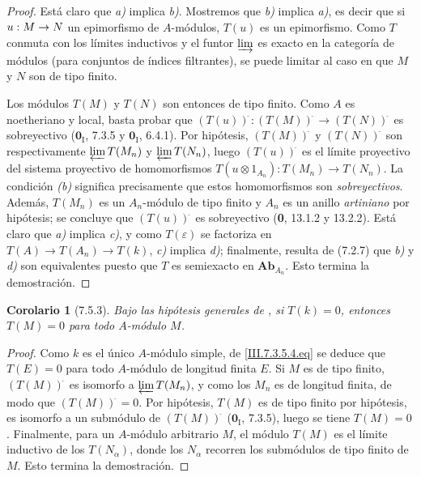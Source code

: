 \documentclass[10pt,oneside,openany]{book}
\theoremstyle{egaenv}\newtheorem*{env}{---}
\theoremstyle{egastatement}
\newtheorem*{corollary}{Corolario}
\theoremstyle{egadescription}
\newcommand{\oldpage}[2][]{\marginnote{\normalfont\scriptsize\textbf{#1}\,|\,#2}\ignorespaces}
\renewcommand{\to}{\mathchoice{\longrightarrow}{\rightarrow}{\rightarrow}{\rightarrow}}
\begin{document}
\begin{proof}
Está claro que \emph{a)} implica \emph{b)}. Mostremos que \emph{b)} implica \emph{a)}, es decir que si $u:M\to N$ un epimorfismo de $A$-módulos, $T(u)$
es un epimorfismo. Como $T$ conmuta con los límites inductivos y el funtor $\varinjlim$ es
exacto en la categoría de módulos (para conjuntos de índices filtrantes),
se puede limitar al caso en que $M$ y $N$ son de tipo
finito.

Los módulos $T(M)$ y $T(N)$ son entonces de tipo finito. Como $A$ es
noetheriano y local, basta probar que
$(T(u))^{\widehat{\,}}:(T(M))^{\widehat{\,}}\longrightarrow(T(N))^{\widehat{\,}}$
es sobreyectivo ($\mathbf{0}_{\mathrm I}$, 7.3.5 y $\mathbf{0}_{\mathrm I}$, 6.4.1). Por hipótesis,
$(T(M))^{\widehat{\,}}$ y $(T(N))^{\widehat{\,}}$ son respectivamente $\varprojlim T(M_n)$
y $\varprojlim T(N_n)$, luego $(T(u))^{\widehat{\,}}$ es el límite proyectivo del sistema proyectivo de
homomorfismos
$T(u\otimes1_{A_n}):T(M_n)\longrightarrow T(N_n)$.
La condición \emph{(b)} significa precisamente que estos homomorfismos son
\emph{sobreyectivos}. Además, $T(M_n)$ es un $A_n$-módulo de tipo finito y
$A_n$ es un anillo \emph{artiniano} por hipótesis; se concluye que $(T(u))^{\widehat{\,}}$ es sobreyectivo (\textbf{0}, 13.1.2 y
13.2.2). Está claro que \emph{a)} implica \emph{c)}, y como $T(\varepsilon)$ se factoriza
en
$T(A)\longrightarrow T(A_n)\longrightarrow T(k)$,
\emph{c)} implica \emph{d)}; finalmente, resulta de (7.2.7) que \emph{b)} y \emph{d)} son equivalentes
puesto que $T$ es
semiexacto en $\boldsymbol{Ab}_{A_n}$. Esto termina la demostración.
\end{proof}

\begin{corollary}[7.5.3]
\label{III.7.5.3}
Bajo las hipótesis generales de , si $T(k)=0$,
entonces $T(M)=0$ para todo $A$-módulo $M$.
\end{corollary}

\begin{proof}
\oldpage[III]{191}
Como $k$ es el único $A$-módulo simple, de
\eqref{III.7.3.5.4.eq} se deduce que $T(E)=0$ para todo $A$-módulo
de longitud finita $E$. Si $M$ es de tipo finito,
$(T(M))^{\widehat{\,}}$ es isomorfo a $\varprojlim T(M_n)$, y como los $M_n$ es de longitud finita, de modo que
$(T(M))^{\widehat{\,}}=0$. Por hipótesis, $T(M)$ es de tipo finito por hipótesis, es isomorfo a un submódulo de $(T(M))^{\widehat{\,}}$
($\mathbf{0}_{\mathrm I}$, 7.3.5), luego se tiene $T(M)=0$. Finalmente, para un $A$-módulo arbitrario $M$, el módulo
$T(M)$ es el límite inductivo de los $T(N_\alpha)$, donde los
$N_\alpha$ recorren los submódulos de tipo finito de $M$. Esto
termina la demostración.
\end{proof}
\end{document}
